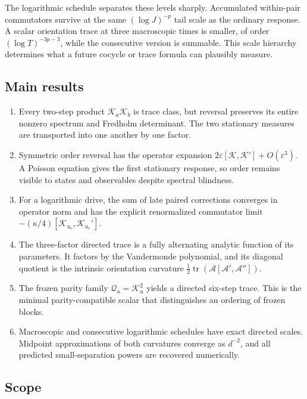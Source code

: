 \documentclass[11pt]{article}
\theoremstyle{definition}
\theoremstyle{remark}
\newcommand{\cK}{\mathcal K}
\newcommand{\cA}{\mathcal A}
\newcommand{\cQ}{\mathcal Q}
\newcommand{\uc}{u_{\mathrm c}}
\newcommand{\tr}{\operatorname{tr}}
\begin{document}
The logarithmic schedule separates these levels sharply.  Accumulated
within-pair commutators survive at the same $(\log J)^{-p}$ tail scale as the
ordinary response.  A scalar orientation trace at three macroscopic times is
smaller, of order $(\log T)^{-3p-3}$, while the consecutive version is
summable.  This scale hierarchy determines what a future cocycle or trace
formula can plausibly measure.

\subsection*{Main results}

\begin{enumerate}[label=\textbf{R\arabic*.},leftmargin=3.2em]
 \item Every two-step product $\cK_a\cK_b$ is trace class, but reversal
 preserves its entire nonzero spectrum and Fredholm determinant.  The two
 stationary measures are transported into one another by one factor.

 \item Symmetric order reversal has the operator expansion
 $2\varepsilon[\cK,\cK']+O(\varepsilon^3)$.  A Poisson equation gives the
 first stationary response, so order remains visible to states and
 observables despite spectral blindness.

 \item For a logarithmic drive, the sum of late paired corrections converges
 in operator norm and has the explicit renormalized commutator limit
 $-(\kappa/4)[\cK_{\uc},\cK_{\uc}']$.

 \item The three-factor directed trace is a fully alternating analytic
 function of its parameters.  It factors by the Vandermonde polynomial, and
 its diagonal quotient is the intrinsic orientation curvature
 $\frac12\tr(\cA[\cA',\cA''])$.

 \item The frozen parity family $\cQ_u=\cK_u^2$ yields a directed six-step
 trace.  This is the minimal parity-compatible scalar that distinguishes an
 ordering of frozen blocks.

 \item Macroscopic and consecutive logarithmic schedules have exact directed
 scales.  Midpoint approximations of both curvatures converge as $d^{-2}$,
 and all predicted small-separation powers are recovered numerically.
\end{enumerate}

\subsection*{Scope}
\end{document}
